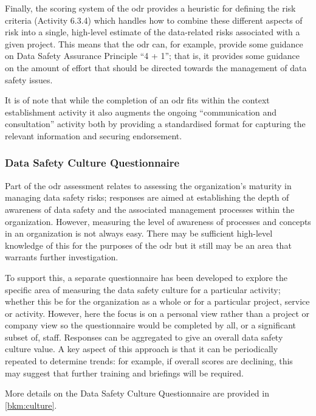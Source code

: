 Finally, the scoring system of the \gls{odr} provides a heuristic for defining the risk criteria
(Activity 6.3.4)
which handles how to combine these different aspects of risk into a single, high-level estimate of the data-related risks associated with a given project. This means that the \gls{odr} can, for example, provide some guidance on Data Safety Assurance Principle ``4 + 1''; that is, it provides some guidance on the amount of effort that should be directed towards the management of data safety issues.
 
It is of note that while the completion of an \gls{odr} fits within the context establishment activity it also augments the ongoing ``communication and consultation'' activity both by providing a standardised format for capturing the relevant information and securing endorsement.

\subsubsection{Data Safety Culture Questionnaire}
Part of the \gls{odr} assessment relates to assessing the organization's maturity in managing data safety risks; responses are aimed at establishing the depth of awareness of data safety and the associated management processes within the organization. However, measuring the level of awareness of processes and concepts in an organization is not always easy. There may be sufficient high-level knowledge of this for the purposes of the \gls{odr} but it still may be an area that warrants further investigation.

To support this, a separate questionnaire has been developed to explore the specific area of measuring the data safety culture for a particular activity; whether this be for the organization as a whole or for a particular project, service or activity. However, here the focus is on a personal view rather than a project or company view so the questionnaire would be completed by all, or a significant subset of, staff. Responses can be aggregated to give an overall data safety culture value. A key aspect of this approach is that it can be periodically repeated to determine trends: for example, if overall scores are declining, this may suggest that further training and briefings will be required.

More details on the Data Safety Culture Questionnaire are provided in \autoref{bkm:culture}.

